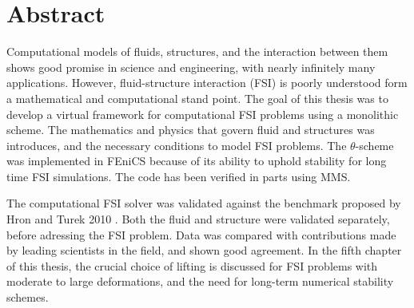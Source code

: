 \section*{Abstract}
Computational models of fluids, structures, and the interaction between them shows good promise in science and engineering, with nearly infinitely many applications. However, fluid-structure interaction (FSI) is poorly understood form a mathematical and computational stand point. The goal of this thesis was to develop a virtual framework for computational FSI problems using a monolithic scheme. The mathematics and physics that govern fluid and structures was introduces, and the necessary conditions to model FSI problems. The $\theta$-scheme was implemented in FEniCS because of its ability to uphold stability for long time FSI simulations. The code has been verified in parts using MMS.\newline

The computational FSI solver was validated against the benchmark proposed by Hron and Turek 2010 \cite{Hron2006a}. Both the fluid and structure were validated separately, before adressing the FSI problem. Data was compared with contributions made by leading scientists in the field, and shown good agreement. In the fifth chapter of this thesis, the crucial choice of lifting is discussed for FSI problems with moderate to large deformations, and the need for long-term numerical stability schemes.



